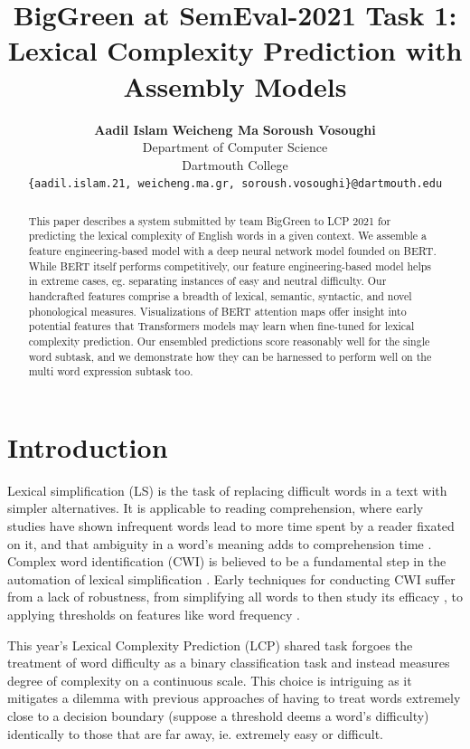 \documentclass[11pt,a4paper]{article}
\title{BigGreen at SemEval-2021 Task 1: \\
Lexical Complexity Prediction with Assembly Models}
\author{
  \textbf{Aadil Islam}\normalfont{,} \textbf{Weicheng Ma}\normalfont{, and} \textbf{Soroush Vosoughi}\\
  Department of Computer Science\\
  Dartmouth College\\
  \texttt{\{aadil.islam.21, weicheng.ma.gr, soroush.vosoughi\}@dartmouth.edu}
}
\date{}
\begin{document}
\maketitle

\begin{abstract}
  This paper describes a system submitted by team BigGreen to LCP 2021 for predicting the lexical complexity of English words in a given context. We assemble a feature engineering-based model with a deep neural network model founded on BERT. While BERT itself performs competitively, our feature engineering-based model helps in extreme cases, eg. separating instances of easy and neutral difficulty. Our handcrafted features comprise a breadth of lexical, semantic, syntactic, and novel phonological measures. Visualizations of BERT attention maps offer insight into potential features that Transformers models may learn when fine-tuned for lexical complexity prediction. Our ensembled predictions score reasonably well for the single word subtask, and we demonstrate how they can be harnessed to perform well on the multi word expression subtask too.
\end{abstract}

\section{Introduction}

Lexical simplification (LS) is the task of replacing difficult words in a text with simpler alternatives. It is applicable to reading comprehension, where early studies have shown infrequent words lead to more time spent by a reader fixated on it, and that ambiguity in a word's meaning adds to comprehension time \citep{raynerd86}. Complex word identification (CWI) is believed to be a fundamental step in the automation of lexical simplification \citep{shardlow2014open}. Early techniques for conducting CWI suffer from a lack of robustness, from simplifying all words to then study its efficacy \citep{devlintait}, to applying thresholds on features like word frequency \citep{10.1007/11573067_19}. 

This year's Lexical Complexity Prediction (LCP) shared task \citep{shardlow2021semeval} forgoes the treatment of word difficulty as a binary classification task \citep{paetzoldspecia:2016:SemEval1, stajner-EtAl:2018:BEA} and instead measures degree of complexity on a continuous scale. This choice is intriguing as it mitigates a dilemma with previous approaches of having to treat words extremely close to a decision boundary (suppose a threshold deems a word's difficulty) identically to those that are far away, ie. extremely easy or difficult.
\end{document}
